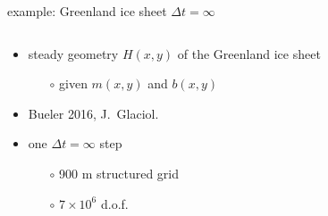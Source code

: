 \documentclass[hide notes,intlimits,usenames,dvipsnames]{beamer}
\begin{document}
\begin{frame}{example: Greenland ice sheet $\Delta t=\infty$}

\begin{columns}
\begin{column}{0.5\textwidth}
\begin{itemize}
\item steady geometry $H(x,y)$ of the Greenland ice sheet
  \begin{itemize}
  \item[$\circ$] given $m(x,y)$ and $b(x,y)$
  \end{itemize}
\item<1-2> Bueler 2016, J.~Glaciol.
\item<1> one $\Delta t=\infty$ step
  \begin{itemize}
  \item[$\circ$] 900 m structured grid
  \item[$\circ$] $7\times 10^6$ d.o.f.
  \end{itemize}


\end{itemize}
\end{column}
\end{columns}
\end{frame}
\end{document}
